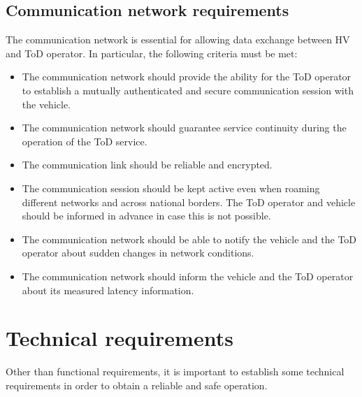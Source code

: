 \subsection{Communication network requirements}
The communication network is essential for allowing data exchange between HV and ToD operator. In particular, the following criteria must be met:
\begin{itemize}
    \item The communication network should provide the ability for the ToD operator to establish a mutually authenticated and secure communication session with the vehicle.
    \item The communication network should guarantee service continuity during the operation of the ToD service.
    \item The communication link should be reliable and encrypted.
    \item The communication session should be kept active even when roaming different networks and across national borders. The ToD operator and vehicle should be informed in advance in case this is not possible.
    \item The communication network should be able to notify the vehicle and the ToD operator about sudden changes in network conditions.
    \item The communication network should inform the vehicle and the ToD operator about its measured latency information.
\end{itemize}

\section{Technical requirements}
Other than functional requirements, it is important to establish some technical requirements in order to obtain a reliable and safe operation.

